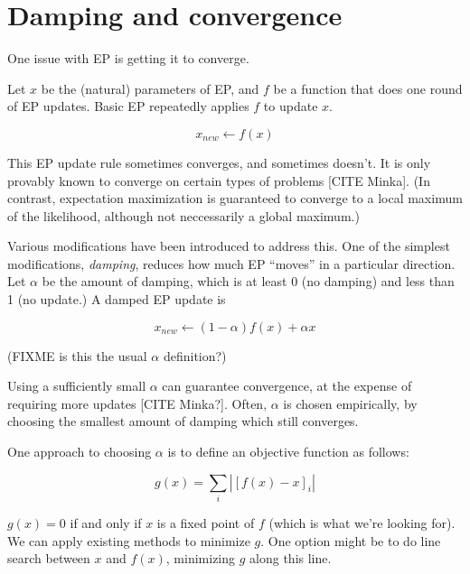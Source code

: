 \documentclass{article}\usepackage[]{graphicx}\usepackage[]{color}
\begin{document}
\section{Damping and convergence}

One issue with EP is getting it to converge.

Let $x$ be the (natural) parameters of EP, and $f$ be a function that
does one round of EP updates. Basic EP repeatedly applies $f$ to update $x$.

\[x_{new} \leftarrow f(x)\]

This EP update rule sometimes converges, and sometimes doesn't.
It is only provably known to converge on certain types of problems [CITE Minka].
(In contrast, expectation maximization is guaranteed to converge
to a local maximum of the likelihood, although not neccessarily a global maximum.)

Various modifications have been introduced to address this.
One of the simplest modifications, {\em damping}, reduces how much EP ``moves''
in a particular direction. Let $\alpha$ be the amount of damping, which is
at least 0 (no
damping) and less than 1 (no update.) A damped EP update is

\[x_{new} \leftarrow (1-\alpha)f(x) + \alpha x\]

(FIXME is this the usual $\alpha$ definition?)

Using a sufficiently small $\alpha$ can guarantee convergence, at the expense
of requiring more updates [CITE Minka?]. Often, $\alpha$ is chosen empirically,
by choosing the smallest amount of damping which still converges.

One approach to choosing $\alpha$ is to define an objective function as follows:

\[g(x) = \sum_i |[f(x) - x]_i|\]

$g(x) = 0$ if and only if $x$ is a fixed point of $f$ (which is what we're looking for).
We can apply existing methods to minimize $g$. One option might be to do line search
between $x$ and $f(x)$, minimizing $g$ along this line.
\end{document}
